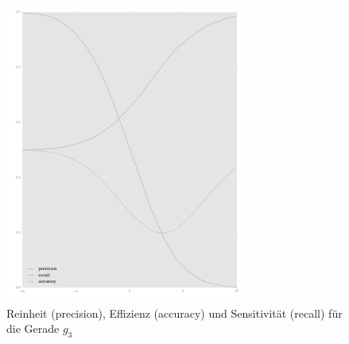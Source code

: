 \begin{figure}
	\centering
	\includegraphics[width=0.7\textwidth]{performace_g1.png}
	\caption{Reinheit (precision), Effizienz (accuracy) und Sensitivität (recall) für die Gerade $g_3$}
\end{figure}




